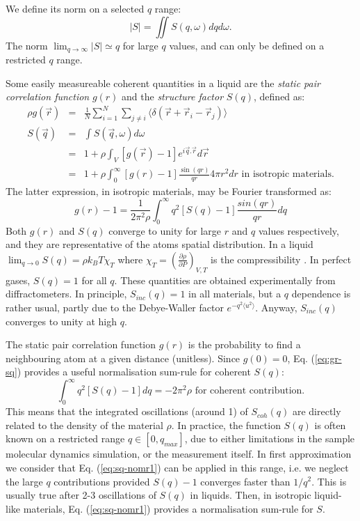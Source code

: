 We define its norm on a selected $q$ range:
\begin{equation}
|S| = \iint S(q,\omega) dq d\omega .
\end{equation}
The norm $\lim_{q \rightarrow \infty} |S| \simeq q$ for large $q$ values, and can only be defined on a restricted $q$ range.

Some easily measureable coherent quantities in a liquid are the \emph{static pair correlation function} $g(r)$ and the \emph{structure factor} $S(q)$, defined as:
\begin{eqnarray}
\rho g(\vec{r}) &=& \frac{1}{N} \sum_{i=1}^N \sum_{j \neq i} \langle \delta(\vec{r}+\vec{r}_i-\vec{r}_j) \rangle \\
S(\vec{q}) &=&\int S(\vec q,\omega) d\omega \label{eq:sq} \\
           &=&1 + \rho \int_V [g(\vec{r})-1] e^{i\vec{q}.\vec{r}} d\vec{r} \\
           &=&1 + \rho \int_{0}^{\infty} [g(r)-1] \frac{\sin(qr)}{qr} 4 \pi r^2 dr \textrm{\ in\ isotropic\ materials.}
\end{eqnarray}
The latter expression, in isotropic materials, may be Fourier transformed as:
\begin{equation}
\label{eq:gr-sq}
g(r)-1 =\frac{1}{2\pi^2 \rho} \int_0^\infty q^2 [S(q) -1] \frac{sin(qr)}{qr} dq
\end{equation}
Both $g(r)$ and $S(q)$ converge to unity for large $r$ and $q$ values respectively, and they are representative of the atoms spatial distribution. In a liquid $\lim_{q \rightarrow 0} S(q) = \rho k_B T \chi_T$ where $\chi_T=(\frac{\partial \rho}{\partial P})_{V,T}$ is the compressibility \cite{Egelstaff67,fischer05}. In perfect gases, $S(q) = 1$ for all $q$. These quantities are obtained experimentally from diffractometers.
In principle, $S_{inc}(q) = 1$ in all materials, but a $q$ dependence is rather usual, partly due to the Debye-Waller factor $e^{-q^2 \langle u^2 \rangle}$. Anyway, $S_{inc}(q)$ converges to unity at high $q$.

The static pair correlation function $g(r)$ is the probability to find a neighbouring atom at a given distance (unitless). Since $g(0) = 0$, Eq. (\ref{eq:gr-sq}) provides a useful normalisation sum-rule for coherent $S(q)$:
\begin{equation}
\label{eq:sq-nomr1}
\int_0^\infty q^2 [S(q) - 1] dq = -2\pi^2\rho \textrm{\ for\ coherent\ contribution.}
\end{equation}
This means that the integrated oscillations (around 1) of $S_{coh}(q)$ are directly related to the density of the material $\rho$.
In practice, the function $S(q)$ is often known on a restricted range $q \in [0, q_{max} ]$, due to either limitations in the sample molecular dynamics simulation, or the measurement itself.
In first approximation we consider that Eq. (\ref{eq:sq-nomr1}) can be applied in this range, i.e. we neglect the large $q$ contributions provided $S(q)-1$ converges faster than $1/q^2$. This is usually true after 2-3 oscillations of $S(q)$ in liquids.
Then, in isotropic liquid-like materials, Eq. (\ref{eq:sq-nomr1}) provides a normalisation sum-rule for $S$.

